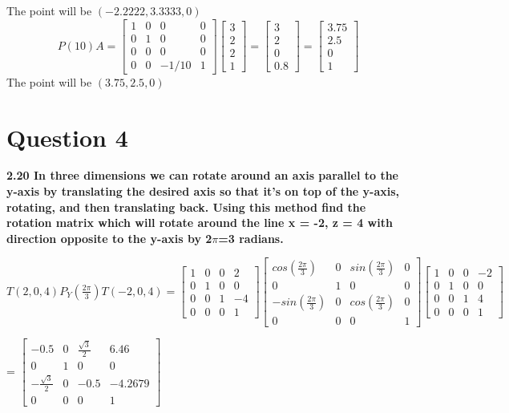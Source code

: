 \documentclass{article}
\begin{document}
The point will be $(-2.2222,3.3333,0)$
$$
P(10) A=\left[\begin{array}{cccc}
1 & 0 & 0 & 0 \\
0 & 1 & 0 & 0 \\
0 & 0 & 0 & 0 \\
0 & 0 & -1 / 10 & 1
\end{array}\right]\left[\begin{array}{l}
3 \\2 \\2 \\1
\end{array}\right]=\left[\begin{array}{c}
3 \\2 \\0 \\0.8
\end{array}\right]=\left[\begin{array}{c}
3.75 \\2.5 \\0 \\1
\end{array}\right]
$$
The point will be $(3.75,2.5,0)$

\section{Question 4}
\textbf{2.20 In three dimensions we can rotate around an axis parallel to the
y-axis by translating the desired axis so that it's on top of the y-axis, rotating,
and then translating back. Using this method find the rotation matrix which
will rotate around the line x = -2, z = 4 with direction opposite to the y-axis
by 2$\pi$=3 radians.}

\begin{center}
    \item $T(2,0,4)P_Y(\frac{2\pi}{3})T(-2,0,4) = \begin{bmatrix}
    1& 0& 0& 2\\ 0& 1& 0& 0\\ 0& 0& 1& -4\\0& 0 &0 &1
    \end{bmatrix}
    \begin{bmatrix}
    cos(\frac{2\pi}{3})& 0& sin(\frac{2\pi}{3})& 0\\ 0& 1& 0& 0\\ -sin(\frac{2\pi}{3})& 0& cos(\frac{2\pi}{3})& 0\\0& 0 & 0 &1
    \end{bmatrix}
    \begin{bmatrix}
    1& 0& 0& -2\\ 0& 1& 0& 0\\ 0& 0& 1& 4\\0& 0 &0 &1
    \end{bmatrix}$ 
    \item = $\begin{bmatrix}
    -0.5& 0& \frac{\sqrt{3}}{2}& 6.46\\ 0& 1& 0& 0\\ -\frac{\sqrt{3}}{2}& 0& -0.5& -4.2679\\0& 0 &0 &1
    \end{bmatrix}$
\end{center}
\end{document}
